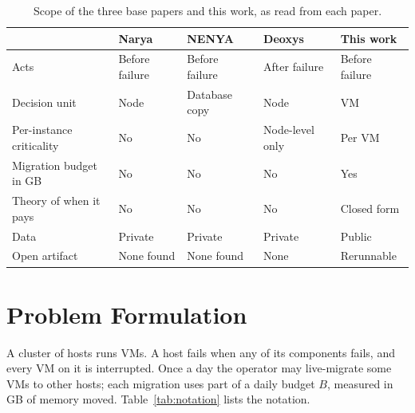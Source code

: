\documentclass[pdflatex,sn-mathphys-num,iicol]{sn-jnl}
\theoremstyle{thmstyleone}%
\theoremstyle{thmstylethree}%
\begin{document}
\begin{table}[!t]\centering
\caption{Scope of the three base papers and this work, as read from each paper.}
\label{tab:gap}
\setlength{\tabcolsep}{4pt}\footnotesize
\begin{tabular}{lllll}\toprule
 & Narya~\cite{levy2020narya} & NENYA~\cite{wang2022nenya} & Deoxys~\cite{zhang2024deoxys} & This work \\ \midrule
Acts & Before failure & Before failure & After failure & Before failure \\
Decision unit & Node & Database copy & Node & VM \\
Per-instance criticality & No & No & Node-level only & Per VM \\
Migration budget in GB & No & No & No & Yes \\
Theory of when it pays & No & No & No & Closed form \\
Data & Private & Private & Private & Public \\
Open artifact & None found & None found & None & Rerunnable \\
\bottomrule\end{tabular}
\end{table}

\section{Problem Formulation}\label{sec:problem}

A cluster of hosts runs VMs. A host fails when any of its components fails, and every VM on it is
interrupted. Once a day the operator may live-migrate some VMs to other hosts; each migration uses
part of a daily budget $B$, measured in GB of memory moved. Table~\ref{tab:notation} lists the
notation.
\end{document}
